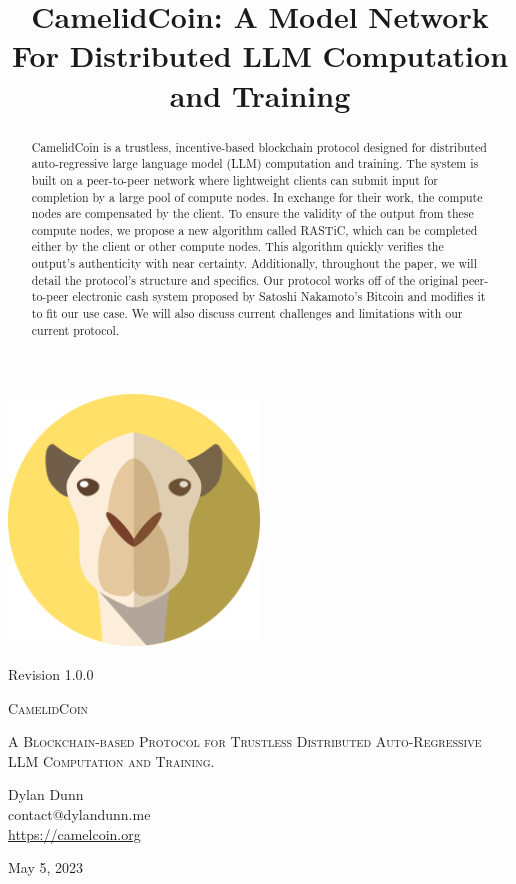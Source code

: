 \documentclass{article}
\title{CamelidCoin: A Model Network For Distributed LLM Computation and Training}
\begin{document}

\begin{titlepage}
    \centering
    \includegraphics[width=0.5\textwidth]{logoLarge.png}\par\vspace{.5cm}
    {\small Revision 1.0.0 \\}
    \vspace{1cm}
    {\fontsize{40}{48}\selectfont\scshape CamelidCoin\par}
    \vspace{1cm}
    {\scshape\Large A Blockchain-based Protocol for Trustless Distributed Auto-Regressive LLM Computation and Training. \par}
    \vspace{2cm}
    {\Large Dylan Dunn \\}
    {\Large contact@dylandunn.me \\}
    \vspace{1cm}
    \url{https://camelcoin.org}
    \vspace{0.5cm}
    \vfill
    {\large May 5, 2023\par}
  \end{titlepage}

\begin{abstract}
CamelidCoin is a trustless, incentive-based blockchain protocol designed for distributed auto-regressive large language model (LLM) computation and training. 
The system is built on a peer-to-peer network where lightweight clients can submit input for completion by a large pool of compute nodes. 
In exchange for their work, the compute nodes are compensated by the client. 
To ensure the validity of the output from these compute nodes, we propose a new algorithm called \ac{RASTiC}, which can be completed either by the client or other compute nodes. 
This algorithm quickly verifies the output's authenticity with near certainty. 
Additionally, throughout the paper, we will detail the protocol's structure and specifics.
Our protocol works off of the original peer-to-peer electronic cash system proposed by Satoshi Nakamoto's Bitcoin and modifies it to fit our use case. 
We will also discuss current challenges and limitations with our current protocol.
\end{abstract}
\end{document}
